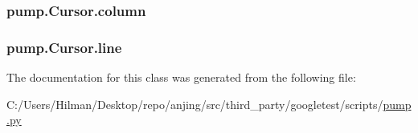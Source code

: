 \subsubsection[{column}]{\setlength{\rightskip}{0pt plus 5cm}pump.\+Cursor.\+column}\label{classpump_1_1_cursor_ae73db76c3a845a82afb334633864254e}
\hypertarget{classpump_1_1_cursor_aee8d8b67360da7fc4e635540cb41d48c}{}
\subsubsection[{line}]{\setlength{\rightskip}{0pt plus 5cm}pump.\+Cursor.\+line}\label{classpump_1_1_cursor_aee8d8b67360da7fc4e635540cb41d48c}


The documentation for this class was generated from the following file\+:\begin{DoxyCompactItemize}
\item 
C\+:/\+Users/\+Hilman/\+Desktop/repo/anjing/src/third\+\_\+party/googletest/scripts/\hyperlink{pump_8py}{pump.\+py}\end{DoxyCompactItemize}
